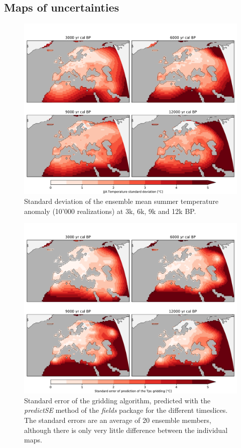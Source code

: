 \documentclass[
11pt, %
english, %
singlespacing, %
headsepline, %
]{MastersDoctoralThesis} %
\begin{document}
\begin{NoHyper}
\begin{refsection}
\begin{subappendices}
	\clearpage

	\section{Maps of uncertainties} \label{sec:gridding-suppl-maps}
		\begin{figure}[h]
			\includegraphics[width=\linewidth]{gridding-figures/ensemble-std.pdf}
			\caption[Ensemble standard deviation]{Standard deviation of the ensemble mean summer temperature anomaly (10'000 realizations) at 3k, 6k, 9k and 12k BP.}
			\label{fig:gridding-gridded-std}
		\end{figure}
		\begin{figure}[h]
			\includegraphics[width=\linewidth]{gridding-figures/ensemble-tps-se.pdf}
			\caption[Standard error of the Tps gridding method]{Standard error of the gridding algorithm, predicted with the \textit{predictSE} method of the \textit{fields} package \citep{NychkaFurrerPaigeEtAl2017} for the different timeslices. The standard errors are an average of 20 ensemble members, although there is only very little difference between the individual maps.}
			\label{fig:gridding-tps-se}
		\end{figure}


\end{subappendices}
\end{refsection}
\end{NoHyper}
\end{document}
